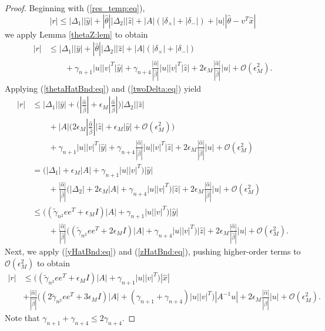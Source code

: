 \documentclass{siamltex}
\newcommand{\eqnref}[1]{(\ref{#1})}
\newcommand{\eps}{\epsilon}
\begin{document}
\begin{proof}
Beginning with \eqnref{res_temp:eq},
\[
|r|  \leq  |\Delta_1| |\hat y| + |\hat \theta| |\Delta_2| |\hat z|  + |A| (|\delta_{\times}| +|\delta_{-}|) + |u| |\hat \theta - v^T \hat x|
\]
we apply Lemma \ref{thetaZ:lem} to obtain
\begin{align*}
|r|  & \leq  |\Delta_1| |\hat y| + |\hat \theta| |\Delta_2| |\hat z|  + |A| (|\delta_{\times}| +|\delta_{-}|)  \\
& \qquad + \gamma_{n+1} |u| |v|^T |\hat y| +
 \gamma_{n+4} \frac{|\hat \alpha|}{|\hat \beta|}  |u| |v|^T |\hat z| + 2 \eps_M \frac{|\hat \alpha|}{|\hat \beta|} |u|  + \mathcal{O}(\eps_M^2).
\end{align*}
Applying \eqnref{thetaHatBnd:eq} and \eqnref{twoDelta:eq} yield
\begin{align*}
|r|  & \leq  |\Delta_1| |\hat y| + \Big( |\frac{\hat \alpha}{\hat \beta}| + \eps_M  |\frac{\hat \alpha}{\hat \beta}| \Big) |\Delta_2| |\hat z|  \\
& \qquad + |A| \Big( 2 \eps_M |\frac{\hat \alpha}{\hat \beta}| |\hat z|  + \eps_M |\hat y| +  \mathcal{O}(\eps_M^2) \Big) \\
& \qquad + \gamma_{n+1} |u| |v|^T |\hat y| +
 \gamma_{n+4} \frac{|\hat \alpha|}{|\hat \beta|}  |u| |v|^T |\hat z| + 2 \eps_M \frac{|\hat \alpha|}{|\hat \beta|} |u|  + \mathcal{O}(\eps_M^2) \\
 & = \Big( |\Delta_1| + \eps_M |A| + \gamma_{n+1} |u| |v|^T \Big) |\hat y| \\
 & \qquad + \frac{|\hat \alpha|}{|\hat \beta|} \Big( |\Delta_2| + 2 \eps_M |A|
+  \gamma_{n+4}  |u| |v|^T \Big) |\hat z| + 2 \eps_M \frac{|\hat \alpha|}{|\hat \beta|} |u|  + \mathcal{O}(\eps_M^2) \\
 & \leq \Big( (\tilde \gamma_{n^2} e e^T + \eps_M I) |A| + \gamma_{n+1} |u| |v|^T \Big) |\hat y| \\
 & \qquad +  \frac{|\hat \alpha|}{|\hat \beta|} \Big( (\tilde \gamma_{n^2} e e^T + 2\eps_M I
) |A| +  \gamma_{n+4}  |u| |v|^T \Big) |\hat z| + 2 \eps_M \frac{|\hat \alpha|}{|\hat \beta|} |u|  + \mathcal{O}(\eps_M^2).
\end{align*}
Next, we apply \eqnref{yHatBnd:eq} and \eqnref{zHatBnd:eq}, pushing higher-order terms to $\mathcal{O}(\eps_M^2)$ to obtain
\begin{align*}
|r| & \leq \Big( (\tilde \gamma_{n^2} e e^T + \eps_M I) |A| + \gamma_{n+1} |u| |v|^T \Big) |\hat x| \\
 & +  \frac{|\hat \alpha|}{|\hat \beta|} \Big( (2\tilde \gamma_{n^2} e e^T + 3\eps_M I
) |A| +  (\gamma_{n+1}  + \gamma_{n+4})  |u| |v|^T \Big) |A^{-1} u| 
+ 2 \eps_M \frac{|\hat \alpha|}{|\hat \beta|} |u|  + \mathcal{O}(\eps_M^2).
\end{align*}
Note that $\gamma_{n+1}  + \gamma_{n+4} \leq 2\gamma_{n+4}$.
\end{proof}
\end{document}
